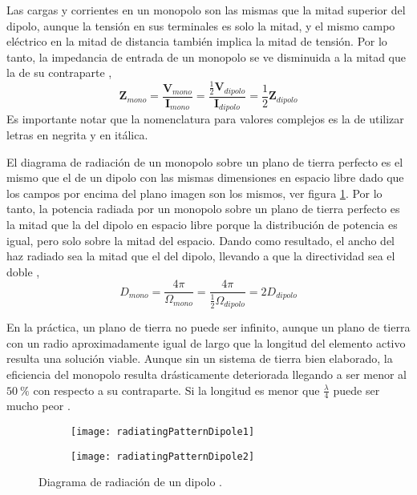 Las cargas y corrientes en un monopolo son las mismas que la mitad superior del dipolo, aunque la tensión en sus terminales es solo la mitad, y el mismo campo eléctrico en la mitad de distancia también implica la mitad de tensión. Por lo tanto, la impedancia de entrada de un monopolo se ve disminuida a la mitad que la de su contraparte \cite{Stutzman2013},
\begin{equation}
\bm{Z}_{mono} = \dfrac{\bm{V}_{mono}}{\bm{I}_{mono}} = \dfrac{\frac{1}{2}\bm{V}_{dipolo}}{\bm{I}_{dipolo}} = \dfrac{1}{2}\bm{Z}_{dipolo}
\end{equation}
Es importante notar que la nomenclatura para valores complejos es la de utilizar letras en negrita y en itálica.

El diagrama de radiación de un monopolo sobre un plano de tierra perfecto es el mismo que el de un dipolo con las mismas dimensiones en espacio libre dado que los campos por encima del plano imagen son los mismos, ver figura \ref{fig:radingPatternDipole}. Por lo tanto, la potencia radiada por un monopolo sobre un plano de tierra perfecto es la mitad que la del dipolo en espacio libre porque la distribución de potencia es igual, pero solo sobre la mitad del espacio. Dando como resultado, el ancho del haz radiado sea la mitad que el del dipolo, llevando a que la directividad sea el doble \cite{Stutzman2013},
\begin{equation}
  D_{mono} = \dfrac{4\pi}{\Omega_{mono}} = \dfrac{4\pi}{\frac{1}{2}\Omega_{dipolo}} = 2D_{dipolo}
\end{equation}

En la práctica, un plano de tierra no puede ser infinito, aunque un plano de tierra con un radio aproximadamente igual de largo que la longitud del elemento activo resulta una solución viable. Aunque sin un sistema de tierra bien elaborado, la eficiencia del monopolo resulta drásticamente deteriorada llegando a ser menor al $\SI{50}{\percent}$ con respecto a su contraparte. Si la longitud es menor que $\frac{\lambda}{4}$ puede ser mucho peor \cite{arrl2007}.

\begin{figure}
  \centering
  \begin{subfigure}[b]{0.4\textwidth}
    \texttt{[image: radiatingPatternDipole1]}
  \end{subfigure}
  \begin{subfigure}[b]{0.4\textwidth}
    \texttt{[image: radiatingPatternDipole2]}
  \end{subfigure}             
  \caption{Diagrama de radiación de un dipolo \cite{arrl2007}.}
  \label{fig:radingPatternDipole}
\end{figure}

